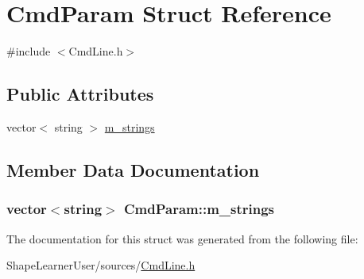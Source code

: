\hypertarget{struct_cmd_param}{}\section{Cmd\+Param Struct Reference}
\label{struct_cmd_param}


{\ttfamily \#include $<$Cmd\+Line.\+h$>$}

\subsection*{Public Attributes}
\begin{DoxyCompactItemize}
\item 
vector$<$ string $>$ \hyperlink{struct_cmd_param_a8a508f19c9f9c444c19bf8e9956cab30}{m\+\_\+strings}
\end{DoxyCompactItemize}


\subsection{Member Data Documentation}
\hypertarget{struct_cmd_param_a8a508f19c9f9c444c19bf8e9956cab30}{}
\subsubsection[{m\+\_\+strings}]{\setlength{\rightskip}{0pt plus 5cm}vector$<$string$>$ Cmd\+Param\+::m\+\_\+strings}\label{struct_cmd_param_a8a508f19c9f9c444c19bf8e9956cab30}


The documentation for this struct was generated from the following file\+:\begin{DoxyCompactItemize}
\item 
Shape\+Learner\+User/sources/\hyperlink{_cmd_line_8h}{Cmd\+Line.\+h}\end{DoxyCompactItemize}
